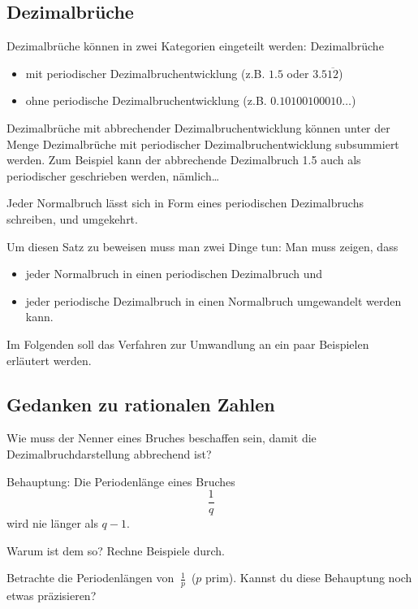 \documentclass[%
11pt,%
twoside,%
titlepage,%
german,%
headsepline%
]{scrartcl}
\begin{document}
\subsection{Dezimalbrüche}

Dezimalbrüche können in zwei Kategorien eingeteilt werden: Dezimalbrüche 
\begin{itemize}
	\item mit periodischer Dezimalbruchentwicklung (z.B. $1.5$ oder $3.5\overline{12}$)
	\item ohne periodische Dezimalbruchentwicklung (z.B. $0.10100100010\dots$)
\end{itemize}

\begin{bem}
Dezimalbrüche mit abbrechender Dezimalbruchentwicklung können unter der Menge Dezimalbrüche mit periodischer Dezimalbruchentwicklung subsummiert werden.
Zum Beispiel kann der abbrechende Dezimalbruch 1.5 auch als periodischer geschrieben werden, nämlich\dots
\end{bem}

\begin{csatz}{}
Jeder Normalbruch lässt sich in Form eines periodischen Dezimalbruchs schreiben, und umgekehrt.
\end{csatz}

Um diesen Satz zu beweisen muss man zwei Dinge tun: Man muss zeigen, dass
\begin{itemize}
	\item jeder Normalbruch in einen periodischen Dezimalbruch und
	\item jeder periodische Dezimalbruch in einen Normalbruch umgewandelt werden kann.
\end{itemize}

Im Folgenden soll das Verfahren zur Umwandlung an ein paar Beispielen erläutert werden.

\subsection{Gedanken zu rationalen Zahlen}

\begin{ueb}
Wie muss der Nenner eines Bruches beschaffen sein, damit die Dezimalbruchdarstellung abbrechend ist?
\end{ueb}

\begin{ueb}[Periodenlänge]
Behauptung: Die Periodenlänge eines Bruches
$$\frac{1}{q}$$
wird nie länger als $q-1$.
	\begin{enumeratea}
	  \item Warum ist dem so? Rechne Beispiele durch.
	  \item Betrachte die Periodenlängen von $\ \frac{1}{p}\,$ ($p$ prim). Kannst du diese Behauptung noch etwas präzisieren?
	\end{enumeratea}
\end{ueb}
\end{document}
